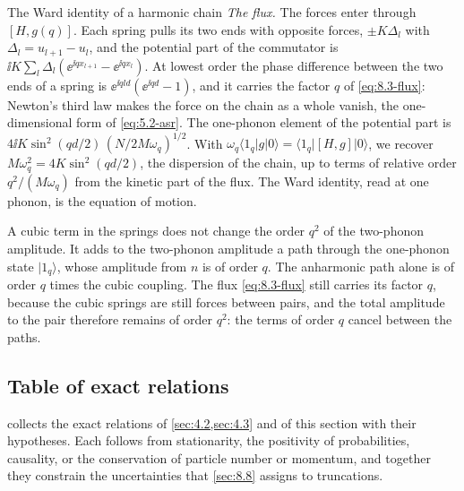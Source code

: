 \begin{workedexample}{The Ward identity of a harmonic chain}
\emph{The flux.} The forces enter through $[H, g(q)]$. Each spring pulls its two ends with opposite forces, $\pm K\Delta_l$ with $\Delta_l = u_{l+1} - u_l$, and the potential part of the commutator is $\ii K\sum_l\Delta_l(\ee^{\ii qx_{l+1}} - \ee^{\ii qx_l})$. At lowest order the phase difference between the two ends of a spring is $\ee^{\ii qld}(\ee^{\ii qd} - 1)$, and it carries the factor $q$ of \cref{eq:8.3-flux}: Newton's third law makes the force on the chain as a whole vanish, the one-dimensional form of \cref{eq:5.2-asr}. The one-phonon element of the potential part is $4\ii K\sin^2(qd/2)\,(N/2M\omega_q)^{1/2}$. With $\omega_q\langle1_q|g|0\rangle = \langle1_q|[H, g]|0\rangle$, we recover $M\omega_q^2 = 4K\sin^2(qd/2)$, the dispersion of the chain, up to terms of relative order $q^2/(M\omega_q)$ from the kinetic part of the flux. The Ward identity, read at one phonon, is the equation of motion.

A cubic term in the springs does not change the order $q^2$ of the two-phonon amplitude. It adds to the two-phonon amplitude a path through the one-phonon state $|1_q\rangle$, whose amplitude from $n$ is of order $q$. The anharmonic path alone is of order $q$ times the cubic coupling. The flux \cref{eq:8.3-flux} still carries its factor $q$, because the cubic springs are still forces between pairs, and the total amplitude to the pair therefore remains of order $q^2$: the terms of order $q$ cancel between the paths.
\end{workedexample}

\subsection{Table of exact relations}\label{sec:8.3-table}

 collects the exact relations of \cref{sec:4.2,sec:4.3} and of this section with their hypotheses. Each follows from stationarity, the positivity of probabilities, causality, or the conservation of particle number or momentum, and together they constrain the uncertainties that \cref{sec:8.8} assigns to truncations.

